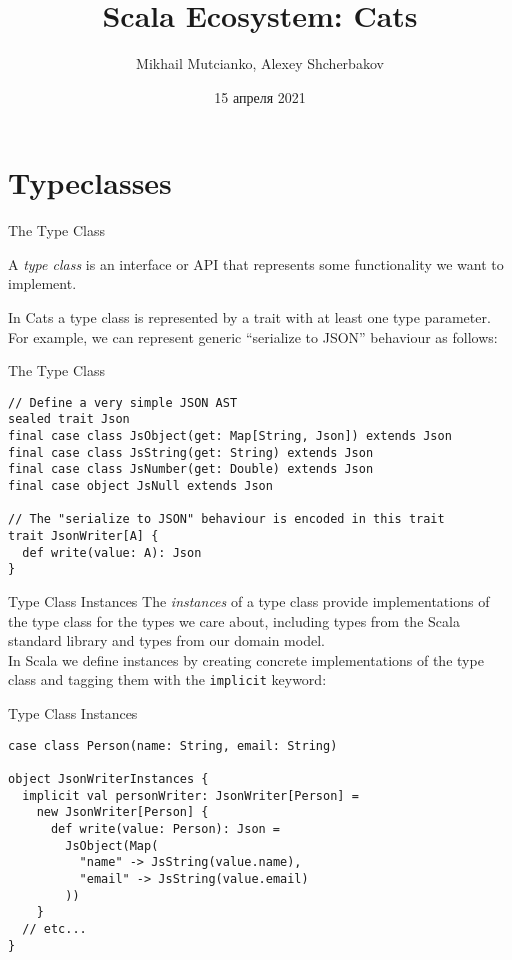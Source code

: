 \documentclass[aspectratio=169]{beamer}
\title{Scala Ecosystem: Cats}
\author{Mikhail Mutcianko, Alexey Shcherbakov}
\institute{СПБгУ, СП}
\date{15 апреля 2021}
\begin{document}
\frame{\titlepage}

\section{Typeclasses}

\begin{frame}[fragile]{The Type Class}
  \begin{block}{}
    A \textit{type class} is an interface or API that represents some functionality we want to implement.
  \end{block}
 In Cats a type class is represented by a trait with at least one type parameter. For example, we can
  represent generic “serialize to JSON” behaviour as follows:
\end{frame}

\begin{frame}[fragile]{The Type Class}
\begin{verbatim}
// Define a very simple JSON AST
sealed trait Json
final case class JsObject(get: Map[String, Json]) extends Json
final case class JsString(get: String) extends Json
final case class JsNumber(get: Double) extends Json
final case object JsNull extends Json

// The "serialize to JSON" behaviour is encoded in this trait
trait JsonWriter[A] {
  def write(value: A): Json
}
\end{verbatim}
\end{frame}

\begin{frame}{Type Class Instances}
  The \textit{instances} of a type class provide implementations of the type class for the types we care
  about, including types from the Scala standard library and types from our domain model. \\

  In Scala we define instances by creating concrete implementations of the type class and tagging
  them with the \texttt{implicit} keyword:
\end{frame}

\begin{frame}[fragile]{Type Class Instances}
\begin{verbatim}
case class Person(name: String, email: String)

object JsonWriterInstances {
  implicit val personWriter: JsonWriter[Person] =
    new JsonWriter[Person] {
      def write(value: Person): Json =
        JsObject(Map(
          "name" -> JsString(value.name),
          "email" -> JsString(value.email)
        ))
    }
  // etc...
}
\end{verbatim}
\end{frame}
\end{document}
